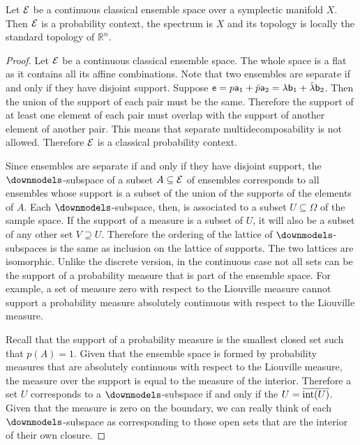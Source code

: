 \begin{prop}
	Let $\Ens$ be a continuous classical ensemble space over a symplectic manifold $X$. Then $\Ens$ is a probability context, the spectrum is $X$ and its topology is locally the standard topology of $\mathbb{R}^n$.
\end{prop}

\begin{proof}
	Let $\Ens$ be a continuous classical ensemble space. The whole space is a flat as it contains all its affine combinations. Note that two ensembles are separate if and only if they have disjoint support. Suppose $\ens = p \ens[a]_1 + \bar{p} \ens[a]_2 = \lambda \ens[b]_1 + \bar{\lambda} \ens[b]_2$. Then the union of the support of each pair must be the same. Therefore the support of at least one element of each pair must overlap with the support of another element of another pair. This means that separate multidecomposability is not allowed. Therefore $\Ens$ is a classical probability context.
	
	Since ensembles are separate if and only if they have disjoint support, the $\separate$-subspace of a subset $A \subseteq \Ens$ of ensembles corresponds to all ensembles whose support is a subset of the union of the supports of the elements of $A$. Each $\separate$-subspace, then, is associated to a subset $U \subseteq \Omega$ of the sample space. If the support of a measure is a subset of $U$, it will also be a subset of any other set $V \supseteq U$. Therefore the ordering of the lattice of $\separate$-subspaces is the same as inclusion on the lattice of supports. The two lattices are isomorphic. Unlike the discrete version, in the continuous case not all sets can be the support of a probability measure that is part of the ensemble space. For example, a set of measure zero with respect to the Liouville measure cannot support a probability measure absolutely continuous with respect to the Liouville measure.
	
	Recall that the support of a probability measure is the smallest closed set such that $p(A) = 1$. Given that the ensemble space is formed by probability measures that are absolutely continuous with respect to the Liouville measure, the measure over the support is equal to the measure of the interior. Therefore a set $U$ corresponds to a $\separate$-subspace if and only if the $U = \overline{\interior(U)}$. Given that the measure is zero on the boundary, we can really think of each $\separate$-subspace as corresponding to those open sets that are the interior of their own closure.
	

\end{proof}
